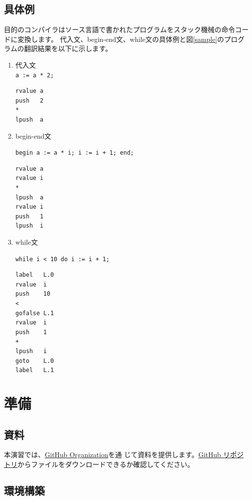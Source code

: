 \documentclass[a4paper,11pt]{jsarticle}
\begin{document}
\subsection{具体例}
目的のコンパイラはソース言語で書かれたプログラムをスタック機械の命令コードに変換します。
代入文、begin-end文、while文の具体例と図\ref{sample}のプログラムの翻訳結果を以下に示します。

\begin{enumerate}
\item 代入文 \\
   \texttt{a := a * 2;} \\
  \begin{lstlisting}
rvalue a
push   2
*
lpush  a
  \end{lstlisting}

\item begin-end文

   \texttt{begin a := a * i; i := i + 1; end;}

  \begin{lstlisting}
rvalue a
rvalue i
*
lpush  a
rvalue i
push   1
lpush  i
  \end{lstlisting}

\item while文

   \texttt{while i < 10 do i := i + 1;}


\begin{lstlisting}
label	L.0
rvalue	i
push	10
<
gofalse	L.1
rvalue	i
push	1
+
lpush	i
goto	L.0
label	L.1
  \end{lstlisting}

\end{enumerate}

\newpage
\section{準備}

\subsection{資料}

本演習では、\href{https://github.com/tmu-compiler-info-sys-exp-I}{GitHub Organization}を通
じて資料を提供します。\href{https://github.com/tmu-compiler-info-sys-exp-I/resume}{GitHub
  リポジトリ}からファイルをダウンロードできるか確認してください。

\subsection{環境構築}
\end{document}
